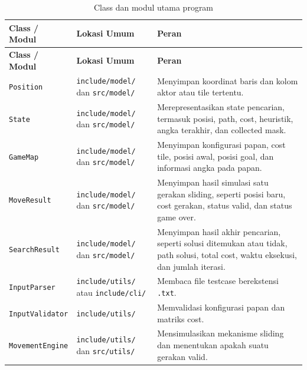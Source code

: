 \begin{longtable}{
	|>{\raggedright\arraybackslash}p{3.1cm}
	|>{\raggedright\arraybackslash}p{4.7cm}
	|>{\raggedright\arraybackslash}p{5.4cm}|
}
	\caption{Class dan modul utama program} \\
	\hline
	\rowcolor{green!15}
	\textbf{Class / Modul} & \textbf{Lokasi Umum} & \textbf{Peran} \\
	\hline
	\endfirsthead
	
	\hline
	\rowcolor{green!15}
	\textbf{Class / Modul} & \textbf{Lokasi Umum} & \textbf{Peran} \\
	\hline
	\endhead
	
	\texttt{Position} 
	& \texttt{include/model/} dan \texttt{src/model/} 
	& Menyimpan koordinat baris dan kolom aktor atau tile tertentu. \\
	\hline
	
	\texttt{State} 
	& \texttt{include/model/} dan \texttt{src/model/} 
	& Merepresentasikan state pencarian, termasuk posisi, path, cost, heuristik, angka terakhir, dan collected mask. \\
	\hline
	
	\texttt{GameMap} 
	& \texttt{include/model/} dan \texttt{src/model/} 
	& Menyimpan konfigurasi papan, cost tile, posisi awal, posisi goal, dan informasi angka pada papan. \\
	\hline
	
	\texttt{MoveResult} 
	& \texttt{include/model/} dan \texttt{src/model/} 
	& Menyimpan hasil simulasi satu gerakan sliding, seperti posisi baru, cost gerakan, status valid, dan status game over. \\
	\hline
	
	\texttt{SearchResult} 
	& \texttt{include/model/} dan \texttt{src/model/} 
	& Menyimpan hasil akhir pencarian, seperti solusi ditemukan atau tidak, path solusi, total cost, waktu eksekusi, dan jumlah iterasi. \\
	\hline
	
	\texttt{InputParser} 
	& \texttt{include/utils/} atau \texttt{include/cli/} 
	& Membaca file testcase berekstensi \texttt{.txt}. \\
	\hline
	
	\texttt{InputValidator} 
	& \texttt{include/utils/} 
	& Memvalidasi konfigurasi papan dan matriks cost. \\
	\hline
	
	\texttt{MovementEngine} 
	& \texttt{include/utils/} dan \texttt{src/utils/} 
	& Mensimulasikan mekanisme sliding dan menentukan apakah suatu gerakan valid. \\
	\hline
	

\end{longtable}
